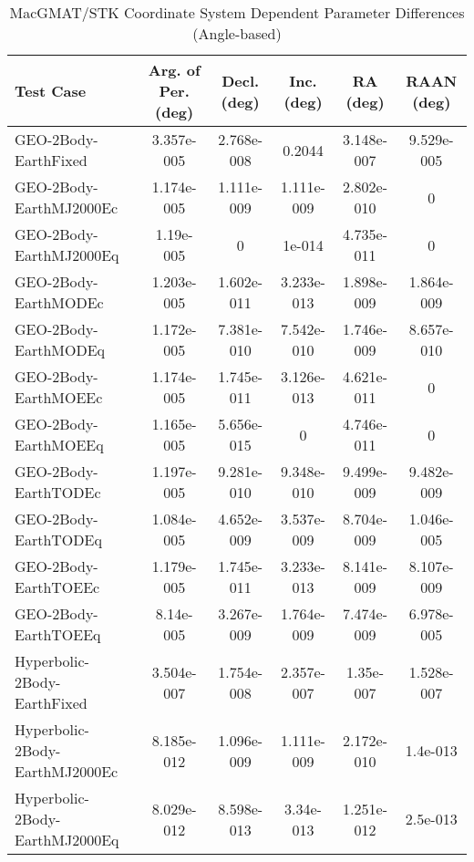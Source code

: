 \begin{table}[htbp!]
\centering
\caption{ MacGMAT/STK Coordinate System Dependent Parameter Differences (Angle-based)}
      \begin{tabular}{lccccc}
      \hline\hline
          Test Case & Arg. of Per. (deg) & Decl. (deg) & Inc. (deg) & RA (deg) & RAAN (deg) \\
         \hline
         GEO-2Body-EarthFixed & 3.357e-005 & 2.768e-008 & 0.2044 & 3.148e-007 & 9.529e-005 \\
         GEO-2Body-EarthMJ2000Ec & 1.174e-005 & 1.111e-009 & 1.111e-009 & 2.802e-010 & 0 \\
         GEO-2Body-EarthMJ2000Eq & 1.19e-005 & 0 & 1e-014 & 4.735e-011 & 0 \\
         GEO-2Body-EarthMODEc & 1.203e-005 & 1.602e-011 & 3.233e-013 & 1.898e-009 & 1.864e-009 \\
         GEO-2Body-EarthMODEq & 1.172e-005 & 7.381e-010 & 7.542e-010 & 1.746e-009 & 8.657e-010 \\
         GEO-2Body-EarthMOEEc & 1.174e-005 & 1.745e-011 & 3.126e-013 & 4.621e-011 & 0 \\
         GEO-2Body-EarthMOEEq & 1.165e-005 & 5.656e-015 & 0 & 4.746e-011 & 0 \\
         GEO-2Body-EarthTODEc & 1.197e-005 & 9.281e-010 & 9.348e-010 & 9.499e-009 & 9.482e-009 \\
         GEO-2Body-EarthTODEq & 1.084e-005 & 4.652e-009 & 3.537e-009 & 8.704e-009 & 1.046e-005 \\
         GEO-2Body-EarthTOEEc & 1.179e-005 & 1.745e-011 & 3.233e-013 & 8.141e-009 & 8.107e-009 \\
         GEO-2Body-EarthTOEEq & 8.14e-005 & 3.267e-009 & 1.764e-009 & 7.474e-009 & 6.978e-005 \\
         Hyperbolic-2Body-EarthFixed & 3.504e-007 & 1.754e-008 & 2.357e-007 & 1.35e-007 & 1.528e-007 \\
         Hyperbolic-2Body-EarthMJ2000Ec & 8.185e-012 & 1.096e-009 & 1.111e-009 & 2.172e-010 & 1.4e-013 \\
         Hyperbolic-2Body-EarthMJ2000Eq & 8.029e-012 & 8.598e-013 & 3.34e-013 & 1.251e-012 & 2.5e-013 \\

\end{tabular}
\end{table}
